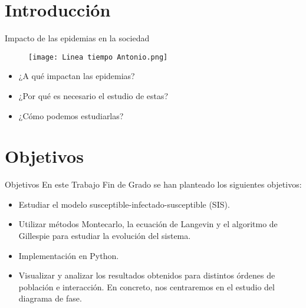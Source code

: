 \documentclass[fontsize=11bp]{beamer}
\begin{document}
\section{Introducción}
\begin{frame}[t]{Impacto de las epidemias en la sociedad}
    \begin{figure}
        \centering
        \texttt{[image: Linea tiempo Antonio.png]}
    \end{figure}
    \begin{block}{}
        \begin{itemize}[<+->]
            \item ¿A qué impactan las epidemias?
            \item ¿Por qué es necesario el estudio de estas?
            \item ¿Cómo podemos estudiarlas?
            

        \end{itemize}
    \end{block}    
\end{frame}


\section{Objetivos}
\begin{frame}[t]{Objetivos}
    En este Trabajo Fin de Grado se han planteado los siguientes objetivos:
        \begin{itemize}[<+->]
            \item Estudiar el modelo susceptible-infectado-susceptible (SIS).
            \item Utilizar métodos Montecarlo, la ecuación de Langevin y el
            algoritmo de Gillespie para estudiar la evolución del sistema.            
            \item Implementación en Python.
            \item Visualizar y analizar los resultados obtenidos para distintos órdenes de población
            e interacción. En concreto, nos centraremos en el estudio del diagrama de fase.

        \end{itemize}

\end{frame}
\end{document}
